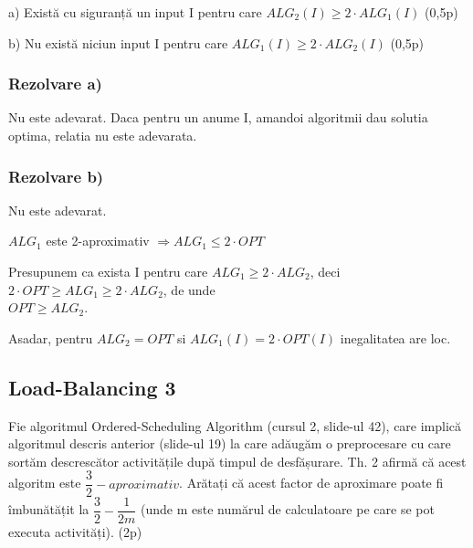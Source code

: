 \documentclass[a4paper]{article}
\begin{document}
a) Există cu siguranță un input I pentru care
$ALG_{2}(I) \geq 2 \cdot ALG_{1}(I)$ \hfill(0,5p)

b) Nu există niciun input I pentru care
$ALG_{1}(I) \geq 2 \cdot ALG_{2}(I)$ \hfill (0,5p)

\subsubsection*{Rezolvare a)}
Nu este adevarat. Daca pentru un anume I, amandoi algoritmii dau solutia optima, relatia nu este adevarata.

\subsubsection*{Rezolvare b)}
\begin{flushleft}
Nu este adevarat.

$ALG_{1}$ este 2-aproximativ $\Rightarrow ALG_{1} \leq 2 \cdot OPT$

Presupunem ca exista I pentru care $ALG_{1} \geq 2 \cdot ALG_{2}$, deci\\
$2 \cdot OPT \geq ALG_{1} \geq 2 \cdot ALG_{2}$, de unde\\
$OPT \geq ALG_{2}$.

Asadar, pentru $ALG_{2} = OPT$ si $ALG_{1}(I) = 2 \cdot OPT(I)$ inegalitatea are loc.
\end{flushleft}

\subsection{Load-Balancing 3}
Fie algoritmul Ordered-Scheduling Algorithm (cursul 2, slide-ul 42),
care implică algoritmul descris anterior (slide-ul 19) la care adăugăm
o preprocesare cu care sortăm descrescător activitățile după timpul de
desfășurare. Th. 2 afirmă că acest algoritm este $\dfrac{3}{2}-aproximativ$. Arătați
că acest factor de aproximare poate fi îmbunătățit la $\dfrac{3}{2}-\dfrac{1}{2m}$ (unde m
este numărul de calculatoare pe care se pot executa activități). \hfill (2p)
\end{document}
